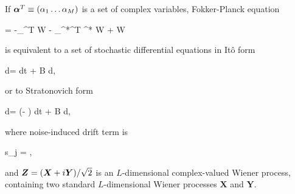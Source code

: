 \begin{theorem}
\label{thm:wigner-bec:fpe:fpe-sde-complex}
	If $\boldsymbol{\alpha}^T \equiv (\alpha_1 \ldots \alpha_M)$ is a set of complex variables,
	Fokker-Planck equation
	\begin{eqn*}
		= -\bpartial_{\balpha}^T \avec W - \bpartial_{\balpha^*}^T \avec^* W
		+  W
	\end{eqn*}
	is equivalent to a set of stochastic differential equations in It\^{o} form
	\begin{eqn*}
		d\balpha = \avec dt + B d\Zvec,
	\end{eqn*}
	or to Stratonovich form
	\begin{eqn*}
		d\balpha = (\avec - \svec) dt + B d\Zvec,
	\end{eqn*}
	where noise-induced drift term is
	\begin{eqn*}
		s_j = \Trace{ B^H \bpartial_{\balpha^*} \evec_j^T B },
	\end{eqn*}
	and $\boldsymbol{Z} = (\bm{X} + i\bm{Y}) / \sqrt{2}$ is an $L$-dimensional complex-valued Wiener process,
	containing two standard $L$-dimensional Wiener processes $\bm{X}$ and $\bm{Y}$.
\end{theorem}
